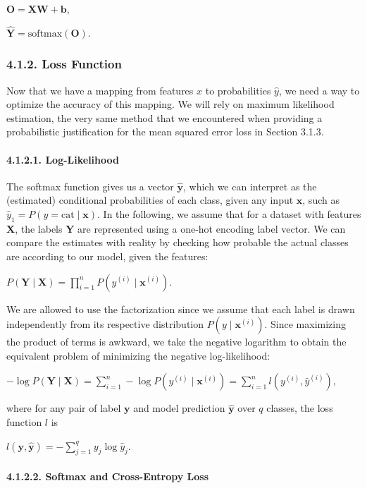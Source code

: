 \documentclass[11pt]{article}
\begin{document}
\(\mathbf{O} = \mathbf{XW} + \mathbf{b}\),

\(\hat{\mathbf{Y}} = \text{softmax}(\mathbf{O})\).

    \subsubsection*{4.1.2. Loss Function}\label{loss-function}

    Now that we have a mapping from features \(x\) to probabilities
\(\hat{y}\), we need a way to optimize the accuracy of this mapping. We
will rely on maximum likelihood estimation, the very same method that we
encountered when providing a probabilistic justification for the mean
squared error loss in Section 3.1.3.

    \paragraph{4.1.2.1. Log-Likelihood}\label{log-likelihood} \mbox{}

    The softmax function gives us a vector \(\hat{\mathbf{y}}\), which we
can interpret as the (estimated) conditional probabilities of each
class, given any input \(\mathbf{x}\), such as
\(\hat{y}_1 = P(y = \text{cat} \mid \mathbf{x})\). In the following, we
assume that for a dataset with features \(\mathbf{X}\), the labels
\(\mathbf{Y}\) are represented using a one-hot encoding label vector. We
can compare the estimates with reality by checking how probable the
actual classes are according to our model, given the features:

\(P(\mathbf{Y} \mid \mathbf{X}) = \prod_{i=1}^{n} P(y^{(i)} \mid \mathbf{x}^{(i)}).\)

We are allowed to use the factorization since we assume that each label
is drawn independently from its respective distribution
\(P(y \mid \mathbf{x}^{(i)})\). Since maximizing the product of terms is
awkward, we take the negative logarithm to obtain the equivalent problem
of minimizing the negative log-likelihood:

\(-\log P(\mathbf{Y} \mid \mathbf{X}) = \sum_{i=1}^{n} - \log P(y^{(i)} \mid \mathbf{x}^{(i)}) = \sum_{i=1}^n l(y^{(i)}, \hat{y}^{(i)})\),

where for any pair of label \(\mathbf{y}\) and model prediction
\(\hat{\mathbf{y}}\) over \(q\) classes, the loss function \(l\) is

\(l(\mathbf{y}, \hat{\mathbf{y}}) = - \sum_{j=1}^{q} y_j \log \hat{y}_j\).

    \paragraph{4.1.2.2. Softmax and Cross-Entropy \mbox{}
Loss}\label{softmax-and-cross-entropy-loss}
\end{document}
